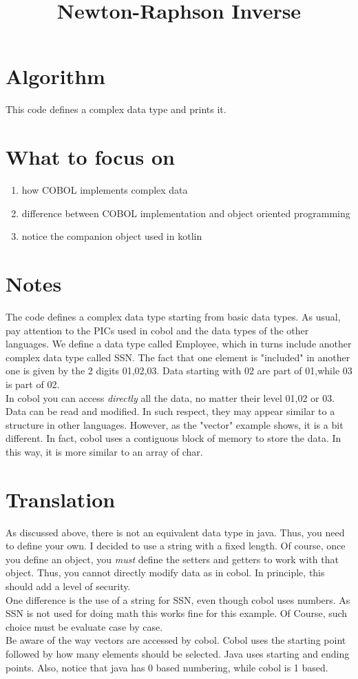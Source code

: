 \documentclass[letterpaper,12pt]{article}
\begin{document}
\title{Newton-Raphson Inverse} 
\maketitle

\section{Algorithm}
This code defines a complex data type and prints it.

\section{What to focus on}
\begin{enumerate}
    \item how COBOL implements complex data
    \item difference between COBOL implementation and object oriented programming
    \item notice the companion object used in kotlin
\end{enumerate}


\section{Notes}
The code defines a complex data type starting from basic data types. As usual, pay  attention to the PICs  used in cobol and the data types of the other languages.
We define a data type called Employee, which in turns include another complex data type called SSN. The fact that one element is "included" in another one is given
by the 2 digits 01,02,03. Data starting with 02 are part of 01,while 03 is part of 02.\\
In cobol  you can access \textsl{directly} all the data, no matter their level 01,02 or 03. Data can be read and modified. In such respect, they may appear similar 
to a structure in other languages. However, as the "vector" example shows, it is a bit different. In fact, cobol uses a contiguous block of memory to store the data.
In this way, it is more similar to an array of char.

\section{Translation}
As discussed above, there is not an equivalent data type in java. Thus, you need to define your own. I decided to use a string with a fixed length.
Of course, once you define an object, you \textsl{must} define the setters and getters to work with that  object. Thus,  you cannot directly modify  data as in cobol.
In principle, this should add a level of security.\\
One difference is the use of a string for SSN, even though cobol uses numbers. As SSN  is not used for doing math this works fine for this example. 
Of Course, such choice must be evaluate case by case.\\
Be aware of the way vectors are accessed by cobol. Cobol uses the starting point followed by how many elements should be selected. Java uses starting and ending points.
Also, notice that java has 0 based numbering, while cobol is 1 based.
\end{document}
